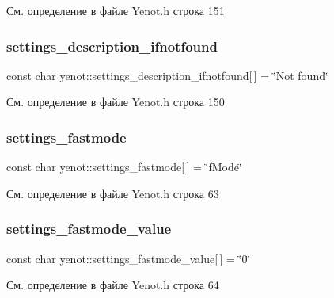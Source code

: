 См. определение в файле Yenot.\+h строка 151

\mbox{\label{namespaceyenot_a53b4bd62fd7a6e3abedfdfb47db53284}} 
\subsubsection{\texorpdfstring{settings\+\_\+description\+\_\+ifnotfound}{settings\_description\_ifnotfound}}
{\footnotesize\ttfamily const char yenot\+::settings\+\_\+description\+\_\+ifnotfound\mbox{[}$\,$\mbox{]} = \char`\"{}Not found\char`\"{}}



См. определение в файле Yenot.\+h строка 150

\mbox{\label{namespaceyenot_a49273bc3609e4a1d9c1a3e4a5cfcdafd}} 
\subsubsection{\texorpdfstring{settings\+\_\+fastmode}{settings\_fastmode}}
{\footnotesize\ttfamily const char yenot\+::settings\+\_\+fastmode\mbox{[}$\,$\mbox{]} = \char`\"{}f\+Mode\char`\"{}}



См. определение в файле Yenot.\+h строка 63

\mbox{\label{namespaceyenot_a860366d2b9aa9cf0d9cdcaf58528c101}} 
\subsubsection{\texorpdfstring{settings\+\_\+fastmode\+\_\+value}{settings\_fastmode\_value}}
{\footnotesize\ttfamily const char yenot\+::settings\+\_\+fastmode\+\_\+value\mbox{[}$\,$\mbox{]} = \char`\"{}0\char`\"{}}



См. определение в файле Yenot.\+h строка 64

